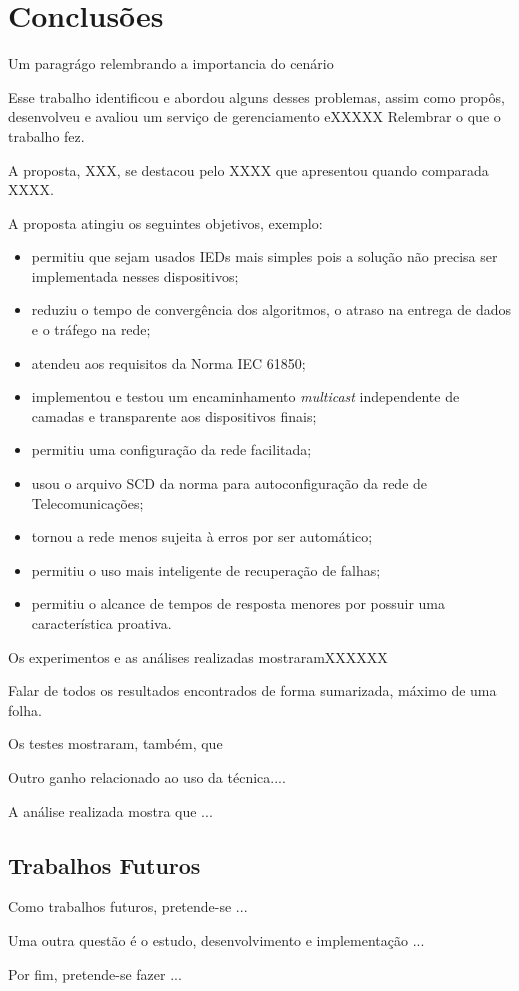 \chapter{Conclusões} \label{cap:conc}

Um paragrágo relembrando a importancia do cenário

Esse trabalho identificou e abordou alguns desses problemas, assim como propôs, desenvolveu e avaliou um serviço de gerenciamento eXXXXX
Relembrar o que o trabalho fez.


A proposta, XXX,  se destacou pelo XXXX que apresentou quando comparada XXXX. 

A proposta atingiu os seguintes objetivos, exemplo:
\begin{itemize}
\item permitiu que sejam usados IEDs mais simples pois a solução não precisa ser implementada nesses dispositivos;
\item reduziu o tempo de convergência dos algoritmos, o atraso na entrega de dados e o tráfego na rede;
\item atendeu aos requisitos da Norma IEC 61850;
\item implementou e testou um encaminhamento \textit{multicast} independente de camadas e transparente aos dispositivos finais;
\item permitiu uma configuração da rede facilitada;
\item usou o arquivo SCD da norma para autoconfiguração da rede de Telecomunicações;
\item tornou a rede menos sujeita à erros por ser automático;
\item permitiu o uso mais inteligente de recuperação de falhas;
\item permitiu o alcance de tempos de resposta menores por possuir uma característica proativa.
\end{itemize}

Os experimentos e as análises realizadas mostraramXXXXXX

Falar de todos os resultados encontrados de forma sumarizada, máximo de uma folha.

Os testes mostraram, também, que 


Outro ganho relacionado ao uso da técnica....

A análise realizada mostra que ...

\section{Trabalhos Futuros}\label{sec:8_trabfut}

Como trabalhos futuros, pretende-se ...

Uma outra questão é o estudo, desenvolvimento e implementação ...

Por fim, pretende-se fazer ...